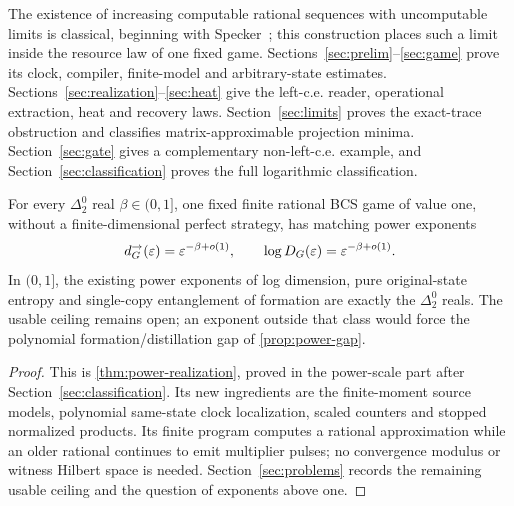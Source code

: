 The existence of increasing computable rational sequences with uncomputable limits is classical, beginning with Specker~\cite{Spe49}; this construction places such a limit inside the resource law of one fixed game. Sections~\ref{sec:prelim}--\ref{sec:game} prove its clock, compiler, finite-model and arbitrary-state estimates. Sections~\ref{sec:realization}--\ref{sec:heat} give the left-c.e. reader, operational extraction, heat and recovery laws. Section~\ref{sec:limits} proves the exact-trace obstruction and classifies matrix-approximable projection minima. Section~\ref{sec:gate} gives a complementary non-left-c.e. example, and Section~\ref{sec:classification} proves the full logarithmic classification.

\begin{theorem}\label{thm:power-front}
For every $\Delta^0_2$ real $\beta\in(0,1]$, one fixed finite rational BCS game of value one, without a finite-dimensional perfect strategy, has matching power exponents
\[
 d_G^\to(\varepsilon)=\varepsilon^{-\beta+o(1)},\qquad \log D_G(\varepsilon)=\varepsilon^{-\beta+o(1)}.
\]
In $(0,1]$, the existing power exponents of log dimension, pure original-state entropy and single-copy entanglement of formation are exactly the $\Delta^0_2$ reals. The usable ceiling remains open; an exponent outside that class would force the polynomial formation/distillation gap of \cref{prop:power-gap}.
\end{theorem}
\begin{proof}
This is \cref{thm:power-realization}, proved in the power-scale part after Section~\ref{sec:classification}. Its new ingredients are the finite-moment source models, polynomial same-state clock localization, scaled counters and stopped normalized products. Its finite program computes a rational approximation while an older rational continues to emit multiplier pulses; no convergence modulus or witness Hilbert space is needed. Section~\ref{sec:problems} records the remaining usable ceiling and the question of exponents above one.
\end{proof}


